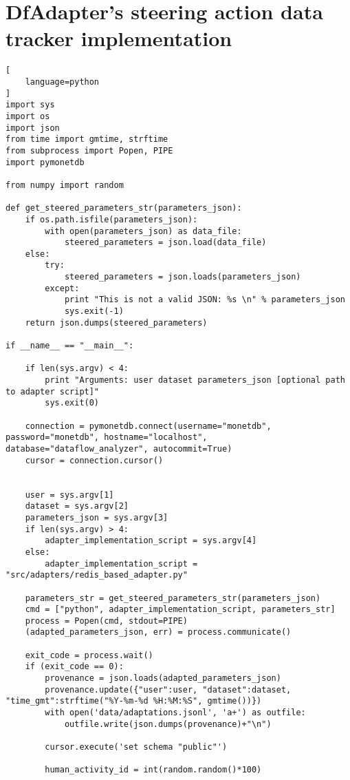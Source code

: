 \chapter{DfAdapter's steering action data tracker implementation}
\label{dfadaptercode}

\noindent
\begin{lstlisting}[
    language=python
]
import sys
import os
import json
from time import gmtime, strftime
from subprocess import Popen, PIPE
import pymonetdb

from numpy import random

def get_steered_parameters_str(parameters_json):
    if os.path.isfile(parameters_json):
        with open(parameters_json) as data_file:
            steered_parameters = json.load(data_file)
    else:
        try:
            steered_parameters = json.loads(parameters_json)
        except:
            print "This is not a valid JSON: %s \n" % parameters_json
            sys.exit(-1)
    return json.dumps(steered_parameters)

if __name__ == "__main__":

    if len(sys.argv) < 4:
        print "Arguments: user dataset parameters_json [optional path to adapter script]"
        sys.exit(0)

    connection = pymonetdb.connect(username="monetdb", password="monetdb", hostname="localhost", database="dataflow_analyzer", autocommit=True)
    cursor = connection.cursor()


    user = sys.argv[1]
    dataset = sys.argv[2]
    parameters_json = sys.argv[3]
    if len(sys.argv) > 4:
        adapter_implementation_script = sys.argv[4]
    else:
        adapter_implementation_script = "src/adapters/redis_based_adapter.py"

    parameters_str = get_steered_parameters_str(parameters_json)
    cmd = ["python", adapter_implementation_script, parameters_str]
    process = Popen(cmd, stdout=PIPE)
    (adapted_parameters_json, err) = process.communicate()

    exit_code = process.wait()
    if (exit_code == 0):
        provenance = json.loads(adapted_parameters_json)
        provenance.update({"user":user, "dataset":dataset, "time_gmt":strftime("%Y-%m-%d %H:%M:%S", gmtime())})
        with open('data/adaptations.jsonl', 'a+') as outfile:
            outfile.write(json.dumps(provenance)+"\n")

        cursor.execute('set schema "public"')

        human_activity_id = int(random.random()*100)


\end{lstlisting}
